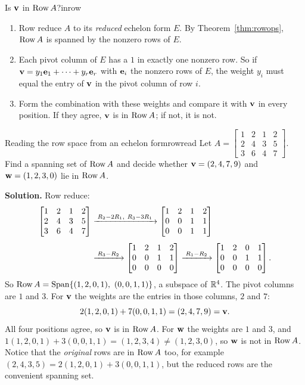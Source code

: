 \documentclass[11pt]{article}
\begin{document}
\begin{proc}{Is $\mathbf{v}$ in $\operatorname{Row} A$?}{inrow}
\begin{enumerate}
  \item Row reduce $A$ to its \emph{reduced} echelon form $E$. By Theorem~\ref{thm:rowops}, $\operatorname{Row} A$ is spanned by the nonzero rows of $E$.
  \item Each pivot column of $E$ has a $1$ in exactly one nonzero row. So if $\mathbf{v}=y_1\mathbf{e}_1+\cdots+y_r\mathbf{e}_r$ with $\mathbf{e}_i$ the nonzero rows of $E$, the weight $y_i$ must equal the entry of $\mathbf{v}$ in the pivot column of row $i$.
  \item Form the combination with these weights and compare it with $\mathbf{v}$ in every position. If they agree, $\mathbf{v}$ is in $\operatorname{Row} A$; if not, it is not.
\end{enumerate}
\end{proc}

\begin{exmp}{Reading the row space from an echelon form}{rowread}
Let $A=\begin{bmatrix}1&2&1&2\\2&4&3&5\\3&6&4&7\end{bmatrix}$. Find a spanning set of $\operatorname{Row} A$ and decide whether $\mathbf{v}=(2,4,7,9)$ and $\mathbf{w}=(1,2,3,0)$ lie in $\operatorname{Row} A$.

\textbf{Solution.} Row reduce:
\begin{align*}
\begin{bmatrix}1&2&1&2\\2&4&3&5\\3&6&4&7\end{bmatrix}
&\xrightarrow{\;R_2-2R_1,\ R_3-3R_1\;}
\begin{bmatrix}1&2&1&2\\0&0&1&1\\0&0&1&1\end{bmatrix}\\[4pt]
&\xrightarrow{\;R_3-R_2\;}
\begin{bmatrix}1&2&1&2\\0&0&1&1\\0&0&0&0\end{bmatrix}
\xrightarrow{\;R_1-R_2\;}
\begin{bmatrix}1&2&0&1\\0&0&1&1\\0&0&0&0\end{bmatrix}.
\end{align*}
So $\operatorname{Row} A=\operatorname{Span}\{(1,2,0,1),\ (0,0,1,1)\}$, a subspace of $\mathbb{R}^4$. The pivot columns are $1$ and $3$. For $\mathbf{v}$ the weights are the entries in those columns, $2$ and $7$:
\[
2(1,2,0,1)+7(0,0,1,1)=(2,4,7,9)=\mathbf{v}.
\]
All four positions agree, so $\mathbf{v}$ is in $\operatorname{Row} A$. For $\mathbf{w}$ the weights are $1$ and $3$, and $1(1,2,0,1)+3(0,0,1,1)=(1,2,3,4)\neq(1,2,3,0)$, so $\mathbf{w}$ is not in $\operatorname{Row} A$. Notice that the \emph{original} rows are in $\operatorname{Row} A$ too, for example $(2,4,3,5)=2(1,2,0,1)+3(0,0,1,1)$, but the reduced rows are the convenient spanning set.
\end{exmp}
\end{document}

